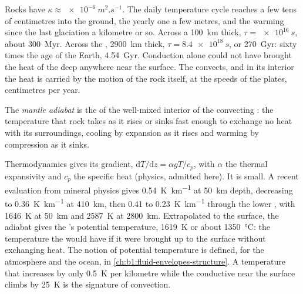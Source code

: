 Rocks have $\kappa \approx \qty{e-6}{m^2.s^{-1}}$. The daily temperature cycle
reaches a few tens of centimetres into the ground, the yearly one a few metres, and
the warming since the last glaciation a kilometre or so. Across a 
\qty{100}{km} thick, $\tau = \qty{e16}{s}$, about \qty{300}{Myr}. Across the
, \qty{2900}{km} thick, $\tau = \qty{8.4e18}{s}$, or \qty{270}{Gyr}: sixty
times the age of the Earth, \qty{4.54}{Gyr}. %
Conduction alone could not have brought the heat of the deep  anywhere
near the surface. The  convects, and in its interior the heat is carried
by the motion of the rock itself, at the speeds of the plates, centimetres per
year. %

\begin{definition}\label{def:b1:heat-budget:adiabat}
The \emph{mantle adiabat} is the  of the
well-mixed interior of the convecting : the temperature that  rock
takes as it rises or sinks fast enough to exchange no heat with its
surroundings, cooling by expansion as it rises and warming by compression as it
sinks.
\end{definition}

Thermodynamics gives its gradient, $\mathrm dT/\mathrm dz = \alpha g T/c_p$,
with $\alpha$ the thermal expansivity and $c_p$ the specific heat (physics,
admitted here). It is small. A recent evaluation from mineral physics gives
\qty{0.54}{K.km^{-1}} at \qty{50}{km} depth, decreasing to \qty{0.36}{K.km^{-1}}
at \qty{410}{km}, then 0.41 to \qty{0.23}{K.km^{-1}} through the lower ,
with \qty{1646}{K} at \qty{50}{km} and \qty{2587}{K} at \qty{2800}{km}.
Extrapolated to the surface, the adiabat gives the 's potential
temperature, \qty{1619}{K} or about \qty{1350}{\degreeCelsius}: the temperature
the  would have if it were brought up to the surface without exchanging
heat. The notion of potential temperature is defined, for the atmosphere and
the ocean, in \cref{ch:b1:fluid-envelopes-structure}. A temperature that
increases by only \qty{0.5}{K} per kilometre while the conductive  near
the surface climbs by \qty{25}{K} is the signature of convection.

